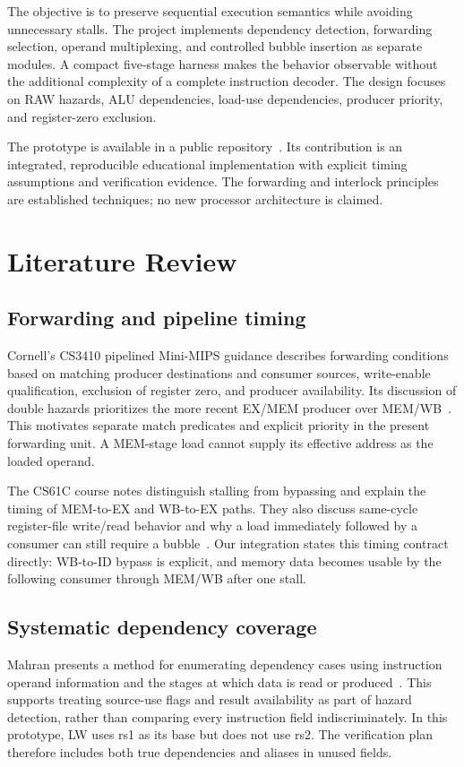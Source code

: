 \documentclass[conference]{IEEEtran}
\begin{document}
The objective is to preserve sequential execution semantics while avoiding unnecessary stalls. The project implements dependency detection, forwarding selection, operand multiplexing, and controlled bubble insertion as separate modules. A compact five-stage harness makes the behavior observable without the additional complexity of a complete instruction decoder. The design focuses on RAW hazards, ALU dependencies, load-use dependencies, producer priority, and register-zero exclusion.

The prototype is available in a public repository~\cite{repo}. Its contribution is an integrated, reproducible educational implementation with explicit timing assumptions and verification evidence. The forwarding and interlock principles are established techniques; no new processor architecture is claimed.

\section{Literature Review}
\subsection{Forwarding and pipeline timing}
Cornell's CS3410 pipelined Mini-MIPS guidance describes forwarding conditions based on matching producer destinations and consumer sources, write-enable qualification, exclusion of register zero, and producer availability. Its discussion of double hazards prioritizes the more recent EX/MEM producer over MEM/WB~\cite{cornell}. This motivates separate match predicates and explicit priority in the present forwarding unit. A MEM-stage load cannot supply its effective address as the loaded operand.

The CS61C course notes distinguish stalling from bypassing and explain the timing of MEM-to-EX and WB-to-EX paths. They also discuss same-cycle register-file write/read behavior and why a load immediately followed by a consumer can still require a bubble~\cite{berkeley}. Our integration states this timing contract directly: WB-to-ID bypass is explicit, and memory data becomes usable by the following consumer through MEM/WB after one stall.

\subsection{Systematic dependency coverage}
Mahran presents a method for enumerating dependency cases using instruction operand information and the stages at which data is read or produced~\cite{mahran}. This supports treating source-use flags and result availability as part of hazard detection, rather than comparing every instruction field indiscriminately. In this prototype, LW uses rs1 as its base but does not use rs2. The verification plan therefore includes both true dependencies and aliases in unused fields.
\end{document}
